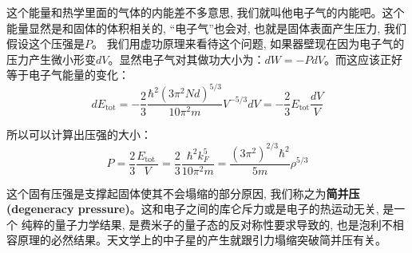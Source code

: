 \documentclass[a4paper,zihao=-4,linespread=1]{ctexrep}
\begin{document}
    这个能量和热学里面的气体的内能差不多意思, 我们就叫他电子气的内能吧。这个能量显然是和固体的体积相关的, “电子气”也会对, 也就是固体表面产生压力, 我们假设这个压强是$P$。
    我们用虚功原理来看待这个问题, 如果器壁现在因为电子气的压力产生微小形变$dV$。显然电子气对其做功大小为：$dW=-PdV$。而这应该正好等于电子气能量的变化：
    \begin{equation}
        d E_{\mathrm{tot}}=-\frac{2}{3} \frac{\hbar^{2}\left(3 \pi^{2} N d\right)^{5 / 3}}{10 \pi^{2} m} V^{-5 / 3} d V=-\frac{2}{3} E_{\mathrm{tot}} \frac{d V}{V}
    \end{equation}
    
    所以可以计算出压强的大小：
    \begin{equation}
        \label{eq:5.32}
        P=\frac{2}{3} \frac{E_{\text {tot }}}{V}=\frac{2}{3} \frac{\hbar^{2} k_{F}^{5}}{10 \pi^{2} m}=\frac{\left(3 \pi^{2}\right)^{2 / 3} \hbar^{2}}{5 m} \rho^{5 / 3}
    \end{equation}
    
    这个固有压强是支撑起固体使其不会塌缩的部分原因, 我们称之为\textbf{简并压(degeneracy pressure)}。这和电子之间的库仑斥力或是电子的热运动无关, 是一个
    纯粹的量子力学结果, 是费米子的量子态的反对称性要求导致的, 也是泡利不相容原理的必然结果。天文学上的中子星的产生就跟引力塌缩突破简并压有关。
\end{document}
